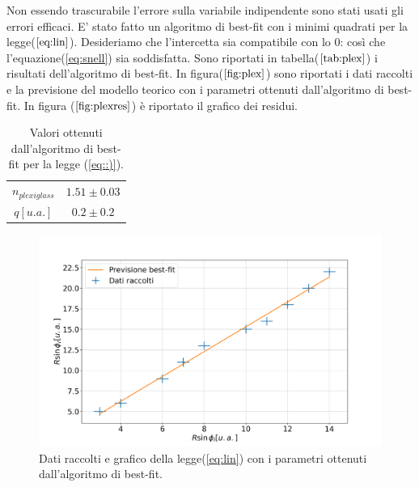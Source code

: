 \documentclass{article}
\begin{document}
Non essendo trascurabile l'errore sulla variabile indipendente sono stati usati gli errori efficaci.
E' stato fatto un algoritmo di best-fit con i minimi quadrati per la legge($\ref{eq:lin}$).
Desideriamo che l'intercetta sia compatibile con lo $0$: così che l'equazione(\ref{eq:snell}) sia soddisfatta.
Sono riportati in tabella($\ref{tab:plex}$) i risultati dell'algoritmo di best-fit.
In figura($\ref{fig:plex}$) sono riportati i dati raccolti e la previsione del modello teorico con i parametri ottenuti dall'algoritmo di best-fit.
In figura ($\ref{fig:plexres}$) è riportato il grafico dei residui.


\begin{table}[H]
		\centering
			\begin{tabular}{|cc|}
				\hline
				$n_{plexiglass}$ & $1.51 \pm 0.03$\\
				$q[u.a.]$ & $0.2 \pm 0.2$\\
				\hline
			\end{tabular}
		\caption{Valori ottenuti dall'algoritmo di best-fit per la legge (\ref{eq::)}).}
		\label{tab:plex}
		
\end{table}


\begin{figure}[H]
	\includegraphics[width=\textwidth]{Dati_raccolti.png}
	\caption{Dati raccolti e grafico della legge(\ref{eq:lin}) con i parametri ottenuti dall'algoritmo di best-fit.}
	\label{fig:plex}
\end{figure}
\end{document}

